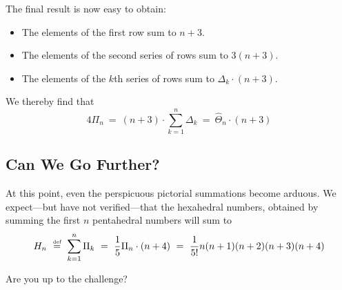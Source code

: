 The final result is now easy to obtain:
\begin{itemize}
\item 
The elements of the first row sum to $n+3$.
\item
The elements of the second series of rows sum to $3 (n+3)$. 
\item
The elements of the $k$th series of rows sum to $\Delta_k \cdot (n+3)$.
\end{itemize}
We thereby find that
\[
4 \Pi_n \ = \ (n+3) \cdot \sum_{k=1}^{n} \Delta_k \ = \ \widehat{\Theta}_n \cdot (n+3)
\]

\subsection{Can We Go Further?}

At this point, even the perspicuous pictorial summations become arduous.  We expect---but have not verified---that the hexahedral numbers, obtained by summing the first $n$ pentahedral numbers will sum to
\[ H_n \ \eqdef \ \sum_{k=1}^n \Pi_k \ = \ {1 \over 5} \Pi_n \cdot (n+4) \ = \ 
{1 \over 5!} n (n+1) (n+2) (n+3) (n+4)
\]

Are you up to the challenge?

